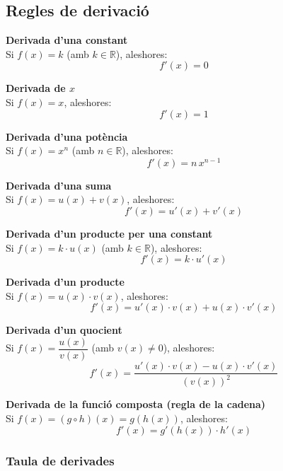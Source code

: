 \documentclass[12pt]{article}
\begin{document}
\subsection{Regles de derivació}

\begin{concept}
\textbf{Derivada d'una constant}\\
Si $f(x)=k$ (amb $k\in\mathbb{R}$), aleshores:
\[
\boxed{f'(x)=0}
\]

\textbf{Derivada de $x$}\\
Si $f(x)=x$, aleshores:
\[
\boxed{f'(x)=1}
\]

\textbf{Derivada d'una potència}\\
Si $f(x)=x^n$ (amb $n\in\mathbb{R}$), aleshores:
\[
\boxed{f'(x)=n\,x^{n-1}}
\]

\textbf{Derivada d'una suma}\\
Si $f(x)=u(x)+v(x)$, aleshores:
\[
\boxed{f'(x)=u'(x)+v'(x)}
\]

\textbf{Derivada d'un producte per una constant}\\
Si $f(x)=k\cdot u(x)$ (amb $k\in\mathbb{R}$), aleshores:
\[
\boxed{f'(x)=k\cdot u'(x)}
\]

\textbf{Derivada d'un producte}\\
Si $f(x)=u(x)\cdot v(x)$, aleshores:
\[
\boxed{f'(x)=u'(x)\cdot v(x)+u(x)\cdot v'(x)}
\]

\textbf{Derivada d'un quocient}\\
Si $f(x)=\dfrac{u(x)}{v(x)}$ (amb $v(x)\neq 0$), aleshores:
\[
\boxed{f'(x)=\frac{u'(x)\cdot v(x)-u(x)\cdot v'(x)}{(v(x))^2}}
\]

\textbf{Derivada de la funció composta (regla de la cadena)}\\
Si $f(x)=(g\circ h)(x)=g(h(x))$, aleshores:
\[
\boxed{f'(x)=g'(h(x))\cdot h'(x)}
\]
\end{concept}


\subsubsection{Taula de derivades}
\end{document}
